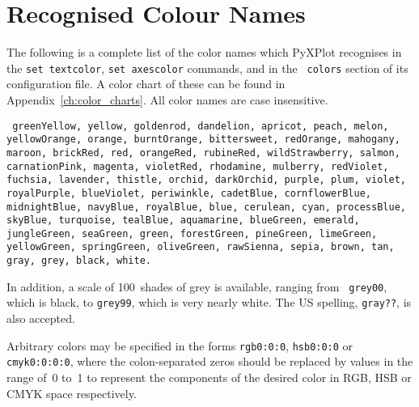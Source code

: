 \section{Recognised Colour Names}
\label{sec:color_names}

The following is a complete list of the color names which PyXPlot recognises
in the {\tt set textcolor}, {\tt set axescolor} commands, and in the {\tt
colors} section of its configuration file.  A color chart of these can be
found in Appendix~\ref{ch:color_charts}.  All color names are case
insensitive.

\vspace{5mm}\noindent
{}
{\tt
greenYellow, yellow, goldenrod, dandelion, apricot, peach, melon,\newline\noindent
yellowOrange, orange, burntOrange, bittersweet, redOrange,\newline\noindent
mahogany, maroon, brickRed, red, orangeRed, rubineRed,\newline\noindent
wildStrawberry, salmon, carnationPink, magenta, violetRed,\newline\noindent
rhodamine, mulberry, redViolet, fuchsia, lavender, thistle,\newline\noindent
orchid, darkOrchid, purple, plum, violet, royalPurple,\newline\noindent
blueViolet, periwinkle, cadetBlue, cornflowerBlue, midnightBlue,\newline\noindent
navyBlue, royalBlue, blue, cerulean, cyan, processBlue, skyBlue,\newline\noindent
turquoise, tealBlue, aquamarine, blueGreen, emerald, jungleGreen,\newline\noindent
seaGreen, green, forestGreen, pineGreen, limeGreen, yellowGreen,\newline\noindent
springGreen, oliveGreen, rawSienna, sepia, brown, tan, gray,\newline\noindent
grey, black, white.
}

\vspace{5mm}
In addition, a scale of 100~shades of grey is available, ranging from {\tt
grey00}, which is black, to {\tt grey99}, which is very nearly white.  The US
spelling, {\tt gray??}, is also accepted.

Arbitrary colors may be specified in the forms {\tt rgb0:0:0}, {\tt hsb0:0:0}
or {\tt cmyk0:0:0:0}, where the colon-separated zeros should be replaced by
values in the range of~0 to~1 to represent the components of the desired color
in RGB, HSB or CMYK space
respectively.

